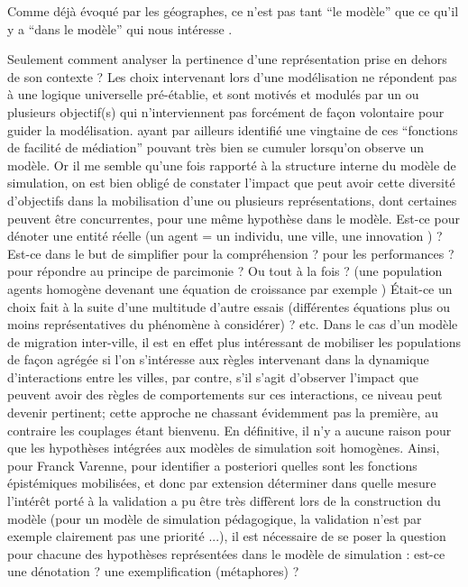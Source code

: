 Comme déjà évoqué par les géographes, ce n'est pas tant \enquote{le modèle} que ce qu'il y a \enquote{dans le modèle} qui nous intéresse \autocites{Sanders2000, Besse2000}.

Seulement comment analyser la pertinence d'une représentation prise en dehors de son contexte ? Les choix intervenant lors d'une modélisation ne répondent pas à une logique universelle pré-établie, et sont motivés et modulés par un ou plusieurs objectif(s) qui n’interviennent pas forcément de façon volontaire pour guider la modélisation. \textcite{Varenne2013} ayant par ailleurs identifié une vingtaine de ces \enquote{fonctions de facilité de médiation} pouvant très bien se cumuler lorsqu’on observe un modèle. Or il me semble qu'une fois rapporté à la structure interne du modèle de simulation, on est bien obligé de constater l'impact que peut avoir cette diversité d'objectifs dans la mobilisation d’une ou plusieurs représentations, dont certaines peuvent être concurrentes, pour une même hypothèse dans le modèle. Est-ce pour dénoter une entité réelle (un agent = un individu, une ville, une innovation ) ? Est-ce dans le but de simplifier pour la compréhension ? pour les performances ? pour répondre au principe de parcimonie ? Ou tout à la fois ? (une population agents homogène devenant une équation de croissance par exemple ) Était-ce un choix fait à la suite d’une multitude d'autre essais (différentes équations plus ou moins représentatives du phénomène à considérer) ? etc. Dans le cas d'un modèle de migration inter-ville, il est en effet plus intéressant de mobiliser les populations de façon agrégée si l'on s'intéresse aux règles intervenant dans la dynamique d'interactions entre les villes, par contre, s'il s'agit d'observer l'impact que peuvent avoir des règles de comportements sur ces interactions, ce niveau peut devenir pertinent; cette approche ne chassant évidemment pas la première, au contraire les couplages étant bienvenu. En définitive, il n'y a aucune raison pour que les hypothèses intégrées aux modèles de simulation soit homogènes. Ainsi, pour Franck Varenne, pour identifier a posteriori quelles sont les fonctions épistémiques mobilisées, et donc par extension déterminer dans quelle mesure l'intérêt porté à la validation a pu être très diffèrent lors de la construction du modèle (pour un modèle de simulation pédagogique, la validation n’est par exemple clairement pas une priorité ...), il est nécessaire de se poser la question pour chacune des hypothèses représentées dans le modèle de simulation : est-ce une dénotation ? une exemplification (métaphores) ?

